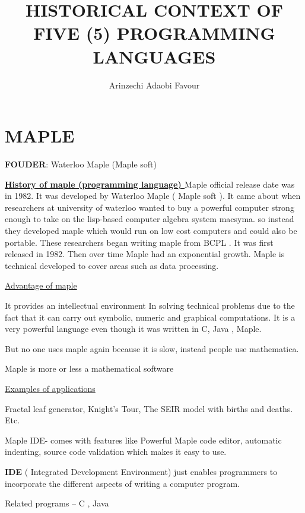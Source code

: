\documentclass{article}
\title{HISTORICAL CONTEXT OF FIVE (5) PROGRAMMING LANGUAGES}
\author{Arinzechi Adaobi Favour}
\begin{document}
	\section{MAPLE}
	
	\textbf{FOUDER}:  Waterloo Maple (Maple soft)

	\textbf{\underline{History of maple (programming language)
	}}
     Maple official release date was in 1982. It was developed by Waterloo Maple ( Maple soft ). It came about when researchers at university of waterloo  wanted to buy a powerful computer strong enough to take on the lisp-based computer algebra system macsyma.  so instead they developed maple  which  would run on low cost computers and  could also be portable. These researchers began writing maple from  BCPL . It was first released in 1982.  Then over time Maple had an exponential growth.  Maple is technical developed to cover areas such as data processing.
     
     \underline{Advantage  of maple}
       
       It provides an intellectual environment In solving technical problems due to the fact that it can carry out symbolic, numeric and graphical computations. It is a very powerful language even though it was written in C, Java , Maple.
       
       But no one uses maple again because it is slow, instead people use mathematica.
       
       Maple is more or less a mathematical software
       
       \underline{Examples of applications
       }
       
       Fractal leaf generator, Knight’s Tour, The SEIR model with births and deaths. Etc.
       
       Maple IDE- comes with features like
       Powerful Maple code editor, automatic indenting, source code validation which makes it easy to use.
       
       \textbf{IDE} ( Integrated Development Environment) just enables programmers to incorporate the different aspects of writing a computer  program.
       
       Related programs – C , Java
       
     \newpage  
     
\end{document}
